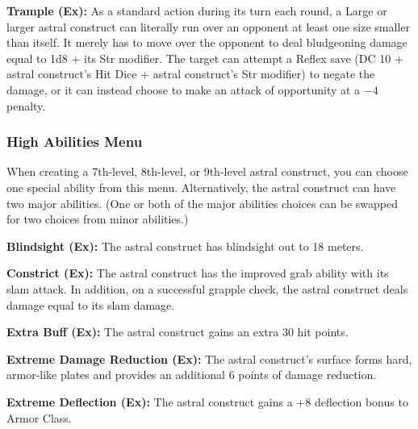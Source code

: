 {	\textbf{Trample (Ex):} As a standard action during its turn each round, a Large or larger astral construct can literally run over an opponent at least one size smaller than itself. It merely has to move over the opponent to deal bludgeoning damage equal to 1d8 + its Str modifier. The target can attempt a Reflex save (DC 10 + \onehalf astral construct's Hit Dice + astral construct's Str modifier) to negate the damage, or it can instead choose to make an attack of opportunity at a $-4$ penalty. 

\subsubsection{High Abilities Menu}
	When creating a 7th-level, 8th-level, or 9th-level astral construct, you can choose one special ability from this menu. Alternatively, the astral construct can have two major abilities. (One or both of the major abilities choices can be swapped for two choices from minor abilities.)

	\textbf{Blindsight (Ex):} The astral construct has blindsight out to 18 meters.


	\textbf{Constrict (Ex):} The astral construct has the improved grab ability with its slam attack. In addition, on a successful grapple check, the astral construct deals damage equal to its slam damage.



	\textbf{Extra Buff (Ex):} The astral construct gains an extra 30 hit points.

	\textbf{Extreme Damage Reduction (Ex):} The astral construct's surface forms hard, armor-like plates and provides an additional 6 points of damage reduction.

	\textbf{Extreme Deflection (Ex):} The astral construct gains a +8 deflection bonus to Armor Class.


}
